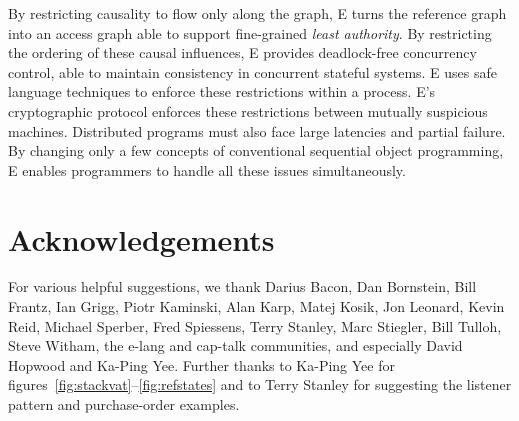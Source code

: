 \documentclass{llncs}
\begin{document}
By restricting causality to flow only along the graph, E turns the
reference graph into an access graph able to support fine-grained
\emph{least authority}. By restricting the ordering of these causal
influences, E provides deadlock-free concurrency control, able to
maintain consistency in concurrent stateful systems.  E uses safe
language techniques to enforce these restrictions within a
process. E's cryptographic protocol enforces these restrictions
between mutually suspicious machines. Distributed programs must also
face large latencies and partial failure. By changing only a few
concepts of conventional sequential object programming, E enables
programmers to handle all these issues simultaneously.

\section{Acknowledgements}
For various helpful suggestions, we thank
Darius Bacon,
Dan Bornstein,
Bill Frantz,
Ian Grigg,
Piotr Kaminski,
Alan Karp,
Matej Kosik,
Jon Leonard,
Kevin Reid,
Michael Sperber,
Fred Spiessens,
Terry Stanley,
Marc Stiegler,
Bill Tulloh,
Steve Witham,
the e-lang and cap-talk communities,
and especially
David Hopwood and
Ka-Ping Yee.
Further thanks to Ka-Ping Yee for
figures~\ref{fig:stackvat}--\ref{fig:refstates}
and to Terry Stanley for suggesting the listener pattern
and purchase-order examples.


%

\end{document}
